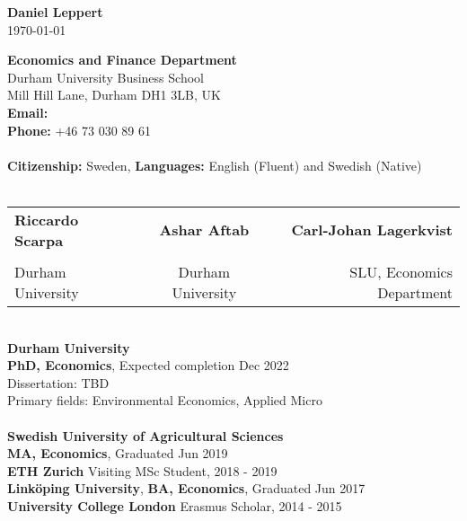 \documentclass[12pt]{article}
\begin{document}
\setlength{\parindent}{0cm}
\begin{center}
{\bf \sc \LARGE Daniel Leppert} \\
\medskip 
\today
\end{center}
\bigskip

{\bf Economics and Finance Department} \\
Durham University Business School \\
Mill Hill Lane, Durham DH1 3LB, UK \\
{\bf Email:} \href{mailto:daniel.j.leppert@durham.ac.uk}{\color{violet}{daniel.j.leppert@durham.ac.uk}} \\
{\bf Phone:} +46 73 030 89 61 \\

{\color{violet}{\large \sc Personal Information}} \\ 
{\bf Citizenship:} Sweden, {\bf Languages:} English (Fluent) and Swedish (Native) \\
\\
{\color{violet}{\large \sc References}} 
\begin{table}[h]
\begin{tabular}{lcr}
{\bf Riccardo Scarpa} & {\bf Ashar Aftab} & {\bf Carl-Johan Lagerkvist} \\
\href{mailto:riccardo.scarpa@durham.ac.uk}{\color{violet}{riccardo.scarpa@durham.ac.uk}} & 
\href{mailto:ashar.aftab@durham.ac.uk}{\color{violet}{ashar.aftab@durham.ac.uk}} &
\href{mailto:carl-johan.lagerkvist@slu.se}{\color{violet}{carl-johan.lagerkvist@slu.se}} \\
Durham University & Durham University & SLU, Economics Department
\end{tabular}
\end{table}

{\color{violet}{\large \sc Doctoral Studies}} \\ 
{\bf Durham University} \\
{{\bf PhD, Economics}, Expected completion Dec 2022} \\
{\sc Dissertation: TBD} \\
{\sc Primary fields:} Environmental Economics, Applied Micro \\

{\color{violet}{\large \sc Prior Education}} \\ 
{\bf Swedish University of Agricultural Sciences} \\
{\bf MA, Economics}, Graduated Jun 2019 \\
{\bf ETH Zurich} Visiting MSc Student, 2018 - 2019 \\
{\bf Linköping University}, {\bf BA, Economics}, Graduated Jun 2017 \\
{\bf University College London} Erasmus Scholar, 2014 - 2015 \\

\end{document}
